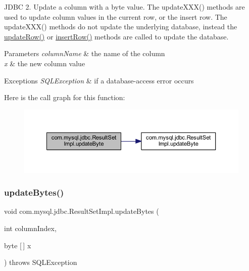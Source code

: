 J\+D\+BC 2. Update a column with a byte value. The update\+X\+X\+X() methods are used to update column values in the current row, or the insert row. The update\+X\+X\+X() methods do not update the underlying database, instead the \mbox{\hyperlink{classcom_1_1mysql_1_1jdbc_1_1_result_set_impl_a2842d32292d023aaeeafedeed3322981}{update\+Row()}} or \mbox{\hyperlink{classcom_1_1mysql_1_1jdbc_1_1_result_set_impl_a78e304e3279cbcf60392f18c1385e3bf}{insert\+Row()}} methods are called to update the database.


\begin{DoxyParams}{Parameters}
{\em column\+Name} & the name of the column \\
\hline
{\em x} & the new column value\\
\hline
\end{DoxyParams}

\begin{DoxyExceptions}{Exceptions}
{\em S\+Q\+L\+Exception} & if a database-\/access error occurs \\
\hline
\end{DoxyExceptions}
Here is the call graph for this function\+:
\nopagebreak
\begin{figure}[H]
\begin{center}
\leavevmode
\includegraphics[width=350pt]{classcom_1_1mysql_1_1jdbc_1_1_result_set_impl_a81493e206e4e56cca567213fe7ae5973_cgraph}
\end{center}
\end{figure}
\mbox{\label{classcom_1_1mysql_1_1jdbc_1_1_result_set_impl_ad8cd4a78e2a5df6084ee649f05cc83eb}} 
\subsubsection{\texorpdfstring{update\+Bytes()}{updateBytes()}\hspace{0.1cm}{\footnotesize\ttfamily [1/2]}}
{\footnotesize\ttfamily void com.\+mysql.\+jdbc.\+Result\+Set\+Impl.\+update\+Bytes (\begin{DoxyParamCaption}\item[{int}]{column\+Index,  }\item[{byte \mbox{[}$\,$\mbox{]}}]{x }\end{DoxyParamCaption}) throws S\+Q\+L\+Exception}

